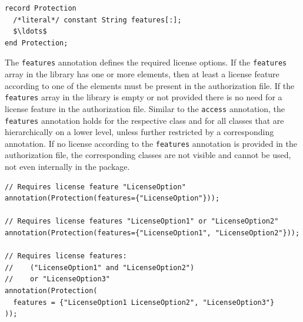 \begin{annotationdefinition*}[features]\label{modelica:Protection.features}
\begin{synopsis}\begin{lstlisting}
record Protection
  /*literal*/ constant String features[:];
  $\ldots$
end Protection;
\end{lstlisting}\end{synopsis}
\begin{semantics}
The \lstinline!features! annotation defines the required license options.
If the \lstinline!features! array in the library has one or more elements, then at least a license feature according to one of the elements must be present in the authorization file.
If the \lstinline!features! array in the library is empty or not provided there is no need for a license feature in the authorization file.
Similar to the \lstinline!access! annotation, the \lstinline!features! annotation holds for the respective class and for all classes that are hierarchically on a lower level, unless further restricted by a corresponding annotation.
If no license according to the \lstinline!features! annotation is provided in the authorization file, the corresponding classes are not visible and cannot be used, not even internally in the package.

\begin{example}
\begin{lstlisting}[language=modelica]
// Requires license feature "LicenseOption"
annotation(Protection(features={"LicenseOption"}));

// Requires license features "LicenseOption1" or "LicenseOption2"
annotation(Protection(features={"LicenseOption1", "LicenseOption2"}));

// Requires license features:
//    ("LicenseOption1" and "LicenseOption2")
//    or "LicenseOption3"
annotation(Protection(
  features = {"LicenseOption1 LicenseOption2", "LicenseOption3"}
));
\end{lstlisting}
\end{example}
\end{semantics}
\end{annotationdefinition*}

